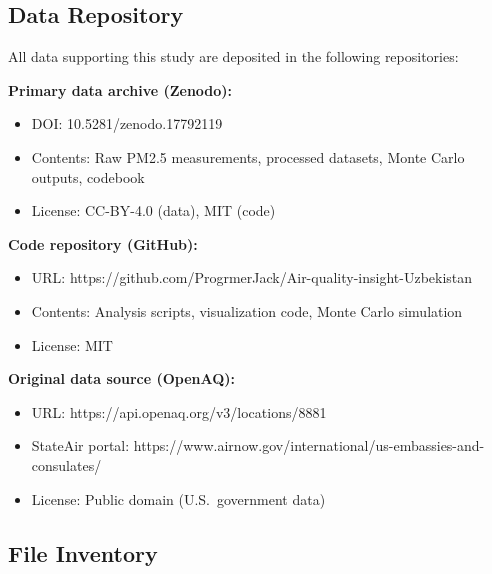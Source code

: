 \documentclass[11pt,a4paper]{article}
\begin{document}

\subsection{Data Repository}

All data supporting this study are deposited in the following repositories:

\textbf{Primary data archive (Zenodo):}
\begin{itemize}
    \item DOI: 10.5281/zenodo.17792119
    \item Contents: Raw PM2.5 measurements, processed datasets, Monte Carlo outputs, codebook
    \item License: CC-BY-4.0 (data), MIT (code)
\end{itemize}

\textbf{Code repository (GitHub):}
\begin{itemize}
    \item URL: https://github.com/ProgrmerJack/Air-quality-insight-Uzbekistan
    \item Contents: Analysis scripts, visualization code, Monte Carlo simulation
    \item License: MIT
\end{itemize}

\textbf{Original data source (OpenAQ):}
\begin{itemize}
    \item URL: https://api.openaq.org/v3/locations/8881
    \item StateAir portal: https://www.airnow.gov/international/us-embassies-and-consulates/
    \item License: Public domain (U.S.\ government data)
\end{itemize}

\subsection{File Inventory}
\end{document}
